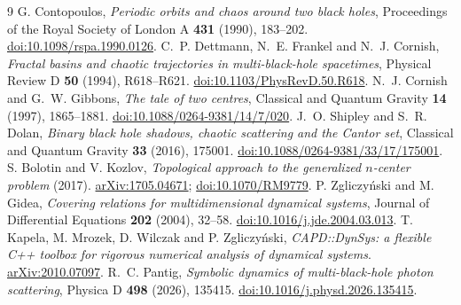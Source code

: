 \begin{thebibliography}{9}
 G. Contopoulos,
\emph{Periodic orbits and chaos around two black holes},
Proceedings of the Royal Society of London A \textbf{431} (1990), 183--202.
\href{https://doi.org/10.1098/rspa.1990.0126}{doi:10.1098/rspa.1990.0126}.
 C.~P. Dettmann, N.~E. Frankel and N.~J. Cornish,
\emph{Fractal basins and chaotic trajectories in multi-black-hole spacetimes},
Physical Review D \textbf{50} (1994), R618--R621.
\href{https://doi.org/10.1103/PhysRevD.50.R618}{doi:10.1103/PhysRevD.50.R618}.
 N.~J. Cornish and G.~W. Gibbons,
\emph{The tale of two centres}, Classical and Quantum Gravity
\textbf{14} (1997), 1865--1881.
\href{https://doi.org/10.1088/0264-9381/14/7/020}{doi:10.1088/0264-9381/14/7/020}.
 J.~O. Shipley and S.~R. Dolan,
\emph{Binary black hole shadows, chaotic scattering and the Cantor set},
Classical and Quantum Gravity \textbf{33} (2016), 175001.
\href{https://doi.org/10.1088/0264-9381/33/17/175001}{doi:10.1088/0264-9381/33/17/175001}.
 S. Bolotin and V. Kozlov,
\emph{Topological approach to the generalized $n$-center problem} (2017).
\href{https://arxiv.org/abs/1705.04671}{arXiv:1705.04671};
\href{https://doi.org/10.1070/RM9779}{doi:10.1070/RM9779}.
 P. Zgliczy\'nski and M. Gidea,
\emph{Covering relations for multidimensional dynamical systems},
Journal of Differential Equations \textbf{202} (2004), 32--58.
\href{https://doi.org/10.1016/j.jde.2004.03.013}{doi:10.1016/j.jde.2004.03.013}.
 T. Kapela, M. Mrozek, D. Wilczak and P. Zgliczy\'nski,
\emph{CAPD::DynSys: a flexible C++ toolbox for rigorous numerical analysis
of dynamical systems}.
\href{https://arxiv.org/abs/2010.07097}{arXiv:2010.07097}.
 R.~C. Pantig,
\emph{Symbolic dynamics of multi-black-hole photon scattering},
Physica D \textbf{498} (2026), 135415.
\href{https://doi.org/10.1016/j.physd.2026.135415}{doi:10.1016/j.physd.2026.135415}.
\end{thebibliography}
